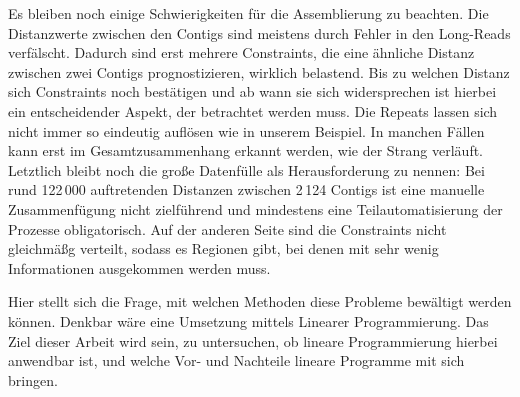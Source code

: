 Es bleiben noch einige Schwierigkeiten für die Assemblierung zu beachten. Die Distanzwerte zwischen den Contigs sind meistens durch Fehler in den Long-Reads verfälscht. Dadurch sind erst mehrere Constraints, die eine ähnliche Distanz zwischen zwei Contigs prognostizieren, wirklich belastend. Bis zu welchen Distanz sich Constraints noch bestätigen und ab wann sie sich widersprechen ist hierbei ein entscheidender Aspekt, der betrachtet werden muss. Die Repeats lassen sich nicht immer so eindeutig auflösen wie in unserem Beispiel. In manchen Fällen kann erst im Gesamtzusammenhang erkannt werden, wie der Strang verläuft. Letztlich bleibt noch die große Datenfülle als Herausforderung zu nennen: Bei rund 122\,000 auftretenden Distanzen zwischen 2\,124 Contigs ist eine manuelle Zusammenfügung nicht zielführend und mindestens eine Teilautomatisierung der Prozesse obligatorisch. Auf der anderen Seite sind die Constraints nicht gleichmäßg verteilt, sodass es Regionen gibt, bei denen mit sehr wenig Informationen ausgekommen werden muss.

Hier stellt sich die Frage, mit welchen Methoden diese Probleme bewältigt werden können. Denkbar wäre eine Umsetzung mittels Linearer Programmierung. Das Ziel dieser Arbeit wird sein, zu untersuchen, ob lineare Programmierung hierbei anwendbar ist, und welche Vor- und Nachteile lineare Programme mit sich bringen.
